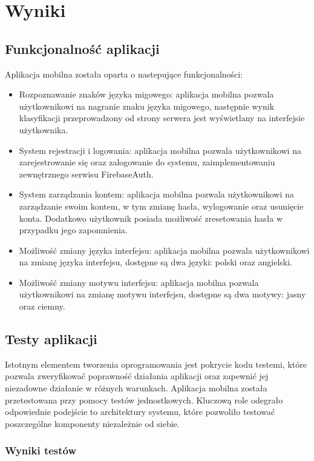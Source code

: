 \chapter{Wyniki}
\section{Funkcjonalność aplikacji}
Aplikacja mobilna została oparta o nastepujące funkcjonalności:
\begin{itemize}
    \item Rozpoznawanie znaków języka migowego: aplikacja mobilna pozwala użytkownikowi na nagranie znaku języka migowego, następnie wynik klasyfikacji przeprowadzony od strony serwera jest wyświetlany na interfejsie użytkownika.
    \item System rejestracji i logowania: aplikacja mobilna pozwala użytkownikowi na zarejestrowanie się oraz zalogowanie do systemu, zaimplementowaniu zewnętrznego serwisu FirebaseAuth.
    \item System zarządzania kontem: aplikacja mobilna pozwala użytkownikowi na zarządzanie swoim kontem, w tym zmianę hasła, wylogowanie oraz usunięcie konta. Dodatkowo użytkownik posiada możliwość zresetowania hasła w przypadku jego zapomnienia.
    \item Możliwość zmiany języka interfejsu: aplikacja mobilna pozwala użytkownikowi na zmianę języka interfejsu, dostępne są dwa języki: polski oraz angielski.
    \item Możliwość zmiany motywu interfejsu: aplikacja mobilna pozwala użytkownikowi na zmianę motywu interfejsu, dostępne są dwa motywy: jasny oraz ciemny.
\end{itemize}

\section{Testy aplikacji}
Istotnym elementem tworzenia oprogramowania jest pokrycie kodu testemi, które pozwala zweryfikować poprawność działania aplikacji oraz zapewnić jej niezadowne działanie w różnych warunkach.
Aplikacja mobilna została przetestowana przy pomocy testów jednostkowych.
Kluczową role odegrało odpowiednie podejście to architektury systemu, które pozwoliło testować poszczególne komponenty niezależnie od siebie.

\subsection{Wyniki testów}

